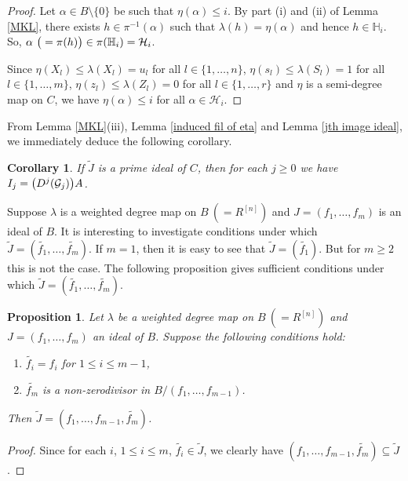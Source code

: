 \documentclass[a4paper,12pt]{article}
\newtheorem{prop}[thm]{Proposition}
\newtheorem{cor}[thm]{Corollary}
\newcommand{\lG}{\mathcal{G}}
\newcommand{\lH}{\mathcal{H}}
\newcommand{\bH}{\mathbb{H}}
\begin{document}
{\begin{proof}
\smallskip\noindent
Let $\alpha\in B\setminus\{0\}$ be such that $\eta(\alpha)\leqslant i$. By part (i) and (ii) of Lemma \ref{MKL}, there exists $h\in\pi^{-1}(\alpha)$ such that $\lambda(h)=\eta(\alpha)$ and hence $h\in\bH_i$. So, $\alpha~\big{(}=\pi(h)\big{)}\in\pi(\bH_i)=\lH_i$.

\smallskip\noindent
Since $\eta(X_l)\leqslant\lambda(X_l)=u_l$ for all $l\in\{1,\dots,n\}$, $\eta(s_l)\leqslant \lambda(S_l)=1$ for all $l\in\{1,\dots,m\}$, $\eta(z_l)\leqslant \lambda(Z_l)=0$ for all $l\in\{1,\dots,r\}$ and $\eta$ is a semi-degree map on $C$, we have $\eta(\alpha)\leqslant i$ for all $\alpha\in\lH_i$.
\end{proof}

\noindent
From Lemma \ref{MKL}(iii), Lemma \ref{induced fil of eta}  and Lemma \ref{jth image ideal}, we immediately deduce the following corollary.
\begin{cor}\label{primality}
If $\widetilde{J}$ is a prime ideal of $C$, then for each $j\geqslant 0$ we have $I_j=\big{(}D^j(\lG_j)\big{)} A$.
\end{cor}

\indent
Suppose $\lambda$ is a weighted degree map on $B~(=R^{[n]})$ and $J=(f_1,\dots,f_m)$ is an ideal of $B$. It is interesting to investigate conditions under which $\widetilde{J}=(\widetilde{f_1},\dots,\widetilde{f_m})$. If $m=1$, then it is easy to see that $\widetilde{J}=(\widetilde{f_1})$. But for $m\geqslant 2$ this is not the case. The following proposition gives sufficient conditions under which $\widetilde{J}=(\widetilde{f_1},\dots,\widetilde{f_m})$.
\begin{prop}\label{top degree ideal}
Let $\lambda$ be a weighted degree map on $B~(=R^{[n]})$ and $J=(f_1,\dots,f_m)$ an ideal of $B$. Suppose the following conditions hold:
\begin{enumerate}
	\item [\rm(i)]$\widetilde{f_i}=f_i$ for $1\leqslant i\leqslant m-1$,
	\item[\rm(ii)] $\widetilde{f_m}$ is a non-zerodivisor in $B/(f_1,\dots,f_{m-1})$.
\end{enumerate}

\noindent
Then $\widetilde{J}=(f_1,\dots,f_{m-1}, \widetilde{f_m})$.
\end{prop}
\begin{proof}
Since for each $i$, $1\leqslant i\leqslant m$, $\widetilde{f_i}\in\widetilde{J}$, we clearly have $(f_1,\dots,f_{m-1}, \widetilde{f_m})\subseteq \widetilde{J}$.


\end{proof}}
\end{document}

